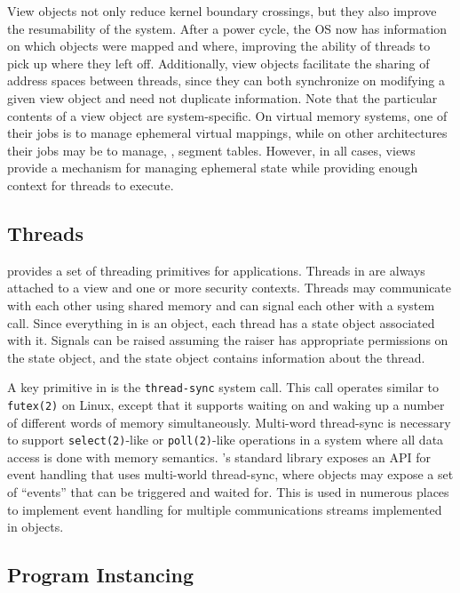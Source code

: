View objects not only reduce kernel boundary crossings, but they also improve the resumability of
the system. After a power cycle, the OS now has information on which objects were mapped and where,
improving the ability of threads to pick up where they left off. Additionally, view objects
facilitate the sharing of address spaces between threads, since they can both synchronize on
modifying a given view object and need not duplicate information. Note that the particular contents
of a view object are system-specific. On virtual memory systems, one of their jobs is to manage
ephemeral virtual mappings, while on other architectures their jobs may be to manage, \eg, segment
tables. However, in all cases, views provide a mechanism for managing ephemeral state while
providing enough context for threads to execute.

\subsection{Threads}

\Twizzler provides a set of threading primitives for applications. Threads in \Twizzler are always
attached to a view and one or more security contexts. Threads may communicate with each other using
shared memory and can signal each other with a system call.
Since everything in \Twizzler is an object, each thread has a state object associated
with it. Signals can be raised assuming the raiser has appropriate permissions on the state object,
and the state object contains information about the thread.

A key primitive in \Twizzler is the \texttt{thread-sync} system call. This call operates similar to
\texttt{futex(2)} on Linux, except that it supports waiting on and waking up a number of different
words of memory simultaneously. Multi-word thread-sync is necessary to support
\texttt{select(2)}-like or \texttt{poll(2)}-like operations in a system where all data access is
done with memory semantics. \Twizzler's standard library exposes an API for event handling that uses
multi-world thread-sync, where objects may expose a set of ``events'' that can be triggered and waited for. This is
used in numerous places to implement event handling for multiple communications streams implemented
in objects.

\subsection{Program Instancing}

